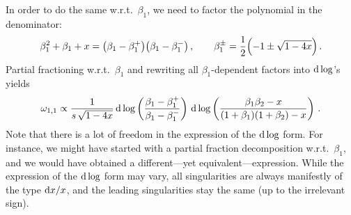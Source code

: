 In order to do the same w.r.t.~$\beta_1$, we need to factor the polynomial in the denominator:
\begin{align} \label{eq:beta1pm}
\beta_1^2 + \beta_1 + x = \bigl(\beta_1 - \beta_1^+ \bigr) \bigl(\beta_1 - \beta_1^- \bigr) \,, \qquad \beta_1^{\pm} = \frac{1}{2} \Bigl(-1 \pm \sqrt{1-4 x} \Bigr) \,.
\end{align}
Partial fractioning w.r.t.~$\beta_1$ and rewriting all $\beta_1$-dependent factors into $\mathrm{d} \log$'s yields
\begin{align} \label{eq:omega11dlogbeta}
\omega_{1,1} \propto \frac{1}{s \, \sqrt{1-4 x}} \, \mathrm{d}\log\left( \frac{\beta_1 - \beta_1^+}{\beta_1 - \beta_1^-} \right) \, \mathrm{d} \log \left( \frac{\beta_1 \beta_2 - x}{(1 + \beta_1)(1 + \beta_2) - x} \right) \,.
\end{align}
Note that there is a lot of freedom in the expression of the $\mathrm{d} \log$ form. For instance, we might have started with a partial fraction decomposition w.r.t.~$\beta_1$, and we would have obtained a different---yet equivalent---expression. While the expression of the $\mathrm{d} \log$ form may vary, all singularities are always manifestly of the type $\mathrm{d} x/x$, and the leading singularities stay the same (up to the irrelevant sign). 

\smallskip

